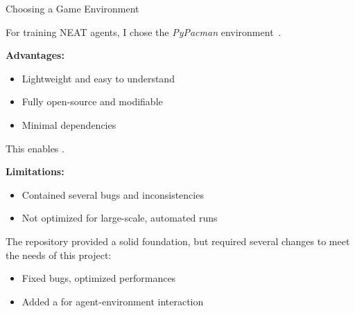\begin{frame}{Choosing a Game Environment}
	
	For training NEAT agents, I chose the \textit{PyPacman} environment~\cite{pypacman}.

	\vspace{0.5em}

	\textbf{Advantages:}
	\begin{itemize}
		\item Lightweight and easy to understand
		\item Fully open-source and modifiable
		\item Minimal dependencies
	\end{itemize}
	This enables .

	\vspace{1em}

	\textbf{Limitations:}
	\begin{itemize}
		\item Contained several bugs and inconsistencies
		\item Not optimized for large-scale, automated runs
	\end{itemize}

	\vspace{1em}

	The repository provided a solid foundation, but required several changes to meet the needs of this project:
	\begin{itemize}
		\item Fixed bugs, optimized performances
		\item Added a  for agent-environment interaction
	\end{itemize}

\end{frame}

